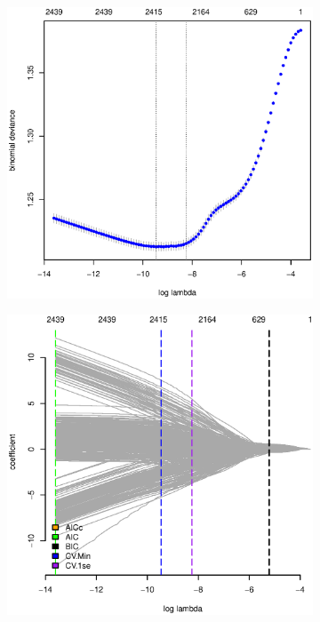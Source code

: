 \documentclass[11pt, fleqn]{article}
\begin{document}
\begin{figure}
  \centering
  \begin{subfigure}[b]{0.49\textwidth}
    \includegraphics[width=\textwidth]{pl_cv_nhl_gamlr_a.eps}
    \caption{}
    \label{fig:pl_cv_nhl}
  \end{subfigure}
  \hfill
  \begin{subfigure}[b]{0.49\textwidth}
    \includegraphics[width=\textwidth]{ic_pl_nhl_c.eps}
    \caption{}
    \label{fig:pl_ic_nhl}
  \end{subfigure}
  \caption{}
\end{figure}
\end{document}
